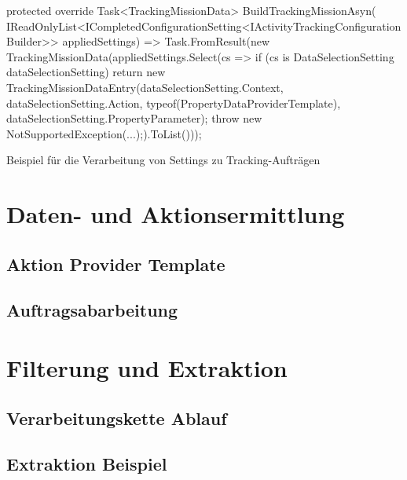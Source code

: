 \begin{program}[H]
\begin{CsCode}
protected override Task<TrackingMissionData> BuildTrackingMissionAsyn(
    IReadOnlyList<ICompletedConfigurationSetting<IActivityTrackingConfigurationBuilder>> appliedSettings) =>
        Task.FromResult(new TrackingMissionData(appliedSettings.Select(cs => {
            if (cs is DataSelectionSetting dataSelectionSetting)
            {
                return new TrackingMissionDataEntry(dataSelectionSetting.Context,
                                                    dataSelectionSetting.Action,
                                                    typeof(PropertyDataProviderTemplate),
                                                    dataSelectionSetting.PropertyParameter);
            }
            throw new NotSupportedException(...);}).ToList()));
\end{CsCode}
\caption{Beispiel für die Verarbeitung von Settings zu Tracking-Aufträgen}
\label{prog:example_processing_of_settings}
\end{program}

\section{Daten- und Aktionsermittlung}
\label{sec:data_collection_impl}

\subsection{Aktion Provider Template}

\subsection{Auftragsabarbeitung}

\section{Filterung und Extraktion}
\label{sec:data_extraction_impl}


\subsection{Verarbeitungskette Ablauf}

\subsection{Extraktion Beispiel}

